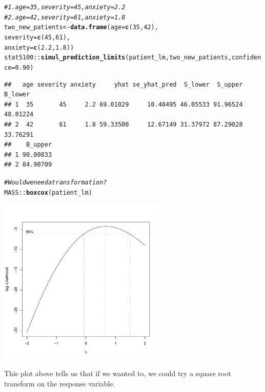 \documentclass{article}\usepackage[]{graphicx}\usepackage[]{color}
\makeatletter
\newcommand{\hlnum}[1]{\textcolor[rgb]{0.686,0.059,0.569}{#1}}%
\newcommand{\hlcom}[1]{\textcolor[rgb]{0.678,0.584,0.686}{\textit{#1}}}%
\newcommand{\hlopt}[1]{\textcolor[rgb]{0,0,0}{#1}}%
\newcommand{\hlstd}[1]{\textcolor[rgb]{0.345,0.345,0.345}{#1}}%
\newcommand{\hlkwb}[1]{\textcolor[rgb]{0.69,0.353,0.396}{#1}}%
\newcommand{\hlkwc}[1]{\textcolor[rgb]{0.333,0.667,0.333}{#1}}%
\newcommand{\hlkwd}[1]{\textcolor[rgb]{0.737,0.353,0.396}{\textbf{#1}}}%
\newenvironment{kframe}{%
 \def\at@end@of@kframe{}%
 \ifinner\ifhmode%
  \def\at@end@of@kframe{\end{minipage}}%
  \begin{minipage}{\columnwidth}%
 \fi\fi%
 \def\FrameCommand##1{\hskip\@totalleftmargin \hskip-\fboxsep
 \colorbox{shadecolor}{##1}\hskip-\fboxsep
     \hskip-\linewidth \hskip-\@totalleftmargin \hskip\columnwidth}%
 \MakeFramed {\advance\hsize-\width
   \@totalleftmargin\z@ \linewidth\hsize
   \@setminipage}}%
 {\par\unskip\endMakeFramed%
 \at@end@of@kframe}
\newenvironment{knitrout}{}{} %
\makeatother
\begin{document}
\begin{knitrout}
\begin{kframe}
\begin{alltt}
\hlcom{#       1. age = 35, severity = 45, anxiety = 2.2}
\hlcom{#       2. age = 42, severity = 61, anxiety = 1.8}
\hlstd{two_new_patients} \hlkwb{<-} \hlkwd{data.frame}\hlstd{(}\hlkwc{age} \hlstd{=} \hlkwd{c}\hlstd{(}\hlnum{35}\hlstd{,} \hlnum{42}\hlstd{),}
                               \hlkwc{severity} \hlstd{=} \hlkwd{c}\hlstd{(}\hlnum{45}\hlstd{,} \hlnum{61}\hlstd{),}
                               \hlkwc{anxiety} \hlstd{=} \hlkwd{c}\hlstd{(}\hlnum{2.2}\hlstd{,} \hlnum{1.8}\hlstd{))}
\hlstd{stat5100}\hlopt{::}\hlkwd{simul_prediction_limits}\hlstd{(patient_lm, two_new_patients,} \hlkwc{confidence} \hlstd{=} \hlnum{0.90}\hlstd{)}
\end{alltt}
\begin{verbatim}
##   age severity anxiety     yhat se_yhat_pred  S_lower  S_upper  B_lower
## 1  35       45     2.2 69.01029     10.40495 46.05533 91.96524 48.01224
## 2  42       61     1.8 59.33500     12.67149 31.37972 87.29028 33.76291
##    B_upper
## 1 90.00833
## 2 84.90709
\end{verbatim}
\begin{alltt}
\hlcom{# Would we need a transformation?}
\hlstd{MASS}\hlopt{::}\hlkwd{boxcox}\hlstd{(patient_lm)}
\end{alltt}
\end{kframe}

{\centering \includegraphics[width=0.6\textwidth]{figure/unnamed-chunk-3-1} 

}



\end{knitrout}

This plot above tells us that if we wanted to, we could try a square root transform on the response variable.
\end{document}

